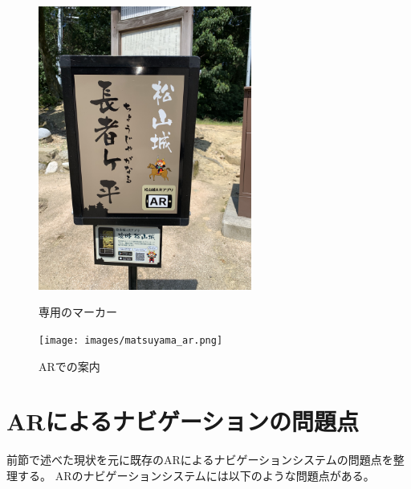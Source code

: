 \begin{figure}[H]
  \begin{minipage}{0.5\hsize}
    \centering
    \includegraphics[width=70mm]{images/matsuyama_marker.jpg}
    \caption{専用のマーカー} \label{fig:matsuyama_marker}
  \end{minipage}
  \begin{minipage}{0.5\hsize}
    \centering
    \texttt{[image: images/matsuyama\_ar.png]}
    \caption{ARでの案内} \label{fig:matsuyama_ar}
  \end{minipage}
\end{figure}



\section{ARによるナビゲーションの問題点}
\label{problems}
前節で述べた現状を元に既存のARによるナビゲーションシステムの問題点を整理する。
ARのナビゲーションシステムには以下のような問題点がある。

